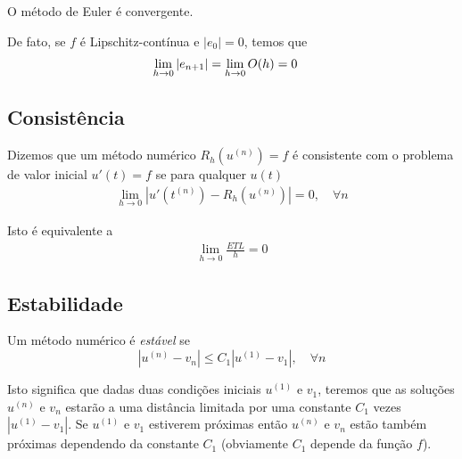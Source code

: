 \begin{teo}
O método de Euler é convergente.
\end{teo}

De fato, se $f$ é Lipschitz-contínua e $|e_0|=0$, temos que
\begin{eqnarray}
 \lim_{h\rightarrow 0} |e_{n+1}|  &= \lim_{h\rightarrow 0} \mathcal \mathcal{O}(h) = 0
\end{eqnarray}


\subsection{Consistência}
\begin{defn}
Dizemos que um método numérico $R_h(u^{(n)})=f$ é consistente com o problema de valor inicial $u'(t)=f$ se para qualquer $u(t)$
\begin{eqnarray}
  \lim_{h \rightarrow 0} |u'(t^{(n)})-R_h(u^{(n)})| = 0, \quad  \forall n
\end{eqnarray}
\end{defn}

Isto é equivalente a
\begin{eqnarray}
  \lim_{h \rightarrow 0} \frac{ETL}{h} = 0
\end{eqnarray}



%
%

\subsection{Estabilidade}
\begin{defn}
Um método numérico é \emph{estável} se
\begin{equation}  |u^{(n)}-v_n| \leq  C_1|u^{(1)}-v_1|, \quad  \forall n \end{equation}
\end{defn}
Isto significa que dadas duas condições iniciais $u^{(1)}$ e $v_1$, teremos que as soluções $u^{(n)}$ e $v_n$ estarão a uma distância limitada  por uma constante $C_1$ vezes $|u^{(1)}-v_1|$. Se $u^{(1)}$ e $v_1$ estiverem próximas então $u^{(n)}$ e $v_n$ estão também próximas dependendo da constante $C_1$ (obviamente $C_1$ depende da função $f$).


